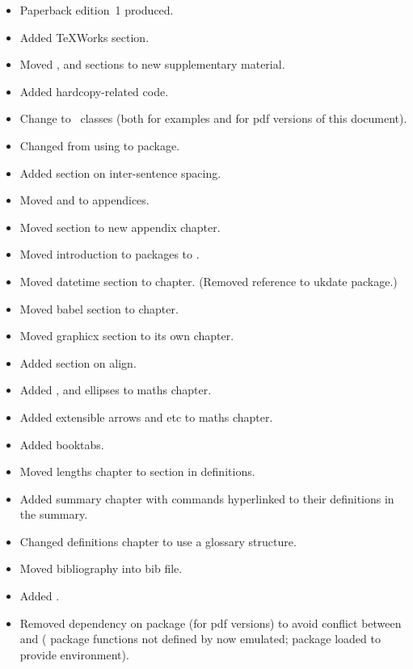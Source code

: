 \begin{itemize}
\item Paperback edition~1 produced.
\item Added TeXWorks section.
\item Moved , 
and  sections to new supplementary material.
\item Added hardcopy-related code.
\item Change to \koma\ classes (both for examples and for pdf
versions of this document).
\item Changed from using  to  package.
\item Added section on inter-sentence spacing.
\item Moved  and  to appendices.
\item Moved section  to
new appendix chapter.
\item Moved introduction to packages to .
\item Moved datetime section to 
chapter. (Removed reference to ukdate package.)
\item Moved babel section to  chapter.
\item Moved graphicx section to its own chapter.
\item Added section on align.
\item Added ,  and  ellipses to maths chapter.
\item Added extensible arrows and  etc to maths
chapter.
\item Added booktabs.
\item Moved lengths chapter to section in definitions.
\item Added summary chapter with commands hyperlinked to their
definitions in the summary.
\item Changed definitions chapter to use a glossary structure.
\item Moved bibliography into bib file.
\item Added .
\item Removed dependency on  package (for pdf versions)
to avoid conflict between  and 
( package functions not defined by 
now emulated;  package loaded to provide
 environment).

\end{itemize}
